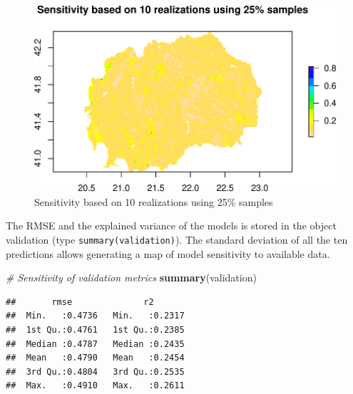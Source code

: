 \documentclass[10pt,b5paper,]{book}
\newenvironment{Shaded}{\begin{snugshade}}{\end{snugshade}}
\newcommand{\CommentTok}[1]{\textcolor[rgb]{0.56,0.35,0.01}{\textit{#1}}}
\newcommand{\DataTypeTok}[1]{\textcolor[rgb]{0.13,0.29,0.53}{#1}}
\newcommand{\DecValTok}[1]{\textcolor[rgb]{0.00,0.00,0.81}{#1}}
\newcommand{\KeywordTok}[1]{\textcolor[rgb]{0.13,0.29,0.53}{\textbf{#1}}}
\newcommand{\NormalTok}[1]{#1}
\newcommand{\OperatorTok}[1]{\textcolor[rgb]{0.81,0.36,0.00}{\textbf{#1}}}
\newcommand{\StringTok}[1]{\textcolor[rgb]{0.31,0.60,0.02}{#1}}
\theoremstyle{definition}
\theoremstyle{definition}
\theoremstyle{definition}
\theoremstyle{remark}
\begin{document}
\begin{Shaded}
\end{Shaded}

\begin{figure}
\centering
\includegraphics{SOCMapping_files/figure-latex/unnamed-chunk-62-1.pdf}
\caption{\label{fig:unnamed-chunk-62}Sensitivity based on 10 realizations
using 25\% samples}
\end{figure}

The RMSE and the explained variance of the models is stored in the
object validation (type \texttt{summary(validation)}). The standard
deviation of all the ten predictions allows generating a map of model
sensitivity to available data.

\begin{Shaded}
\begin{Highlighting}[]
\CommentTok{# Sensitivity of validation metrics}
\KeywordTok{summary}\NormalTok{(validation)}
\end{Highlighting}
\end{Shaded}

\begin{verbatim}
##       rmse              r2        
##  Min.   :0.4736   Min.   :0.2317  
##  1st Qu.:0.4761   1st Qu.:0.2385  
##  Median :0.4787   Median :0.2435  
##  Mean   :0.4790   Mean   :0.2454  
##  3rd Qu.:0.4804   3rd Qu.:0.2535  
##  Max.   :0.4910   Max.   :0.2611
\end{verbatim}
\end{document}
